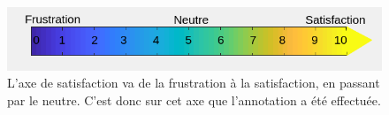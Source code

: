 \begin{figure}[h]
  \centering
  \includegraphics[width=\textwidth]{./Chapitre4/figures/satisfactionAxis.png}
  \caption{L'axe de satisfaction va de la frustration à la satisfaction, en passant par le neutre. C'est donc sur cet axe que l'annotation a été effectuée.}
  \label{fig:satisfactionAxis}
\end{figure}
